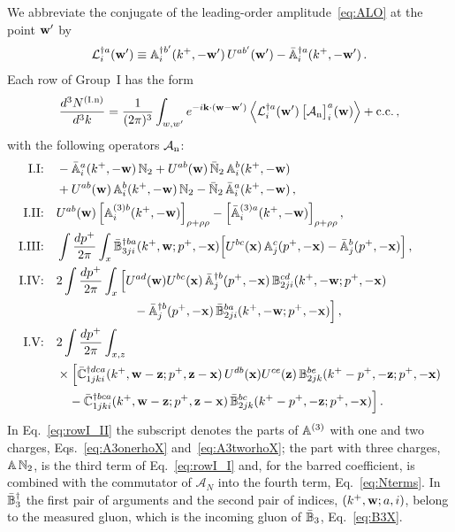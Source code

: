 We abbreviate the conjugate of the leading-order amplitude~\eqref{eq:ALO} at the point $\mathbf{w}'$ by
\begin{align}\label{eq:Ldag}
\mathcal L^{\dagger a}_i(\mathbf{w}')\equiv\mathbb{A}^{\dagger b'}_i(k^+,-\mathbf{w}')\,U^{ab'}(\mathbf{w}')-\bar{\mathbb{A}}^{\dagger a}_i(k^+,-\mathbf{w}')\,.
\end{align}
Each row of Group~I has the form
\begin{align}\label{eq:GroupIform}
\frac{d^3N^{\rm(I.n)}}{d^3k}=\frac{1}{(2\pi)^3}\int_{w,w'}e^{-i\mathbf{k}\cdot(\mathbf{w}-\mathbf{w}')}\,\Big\langle\mathcal L^{\dagger a}_i(\mathbf{w}')\,\big[\mathcal A_{\rm n}\big]^a_i(\mathbf{w})\Big\rangle+{\rm c.c.}\,,
\end{align}
with the following operators $\mathcal A_{\rm n}$:
\begin{align}
\text{I.I:}\quad&-\bar{\mathbb{A}}^a_i(k^+,-\mathbf{w})\,\mathbb{N}_2+U^{ab}(\mathbf{w})\,\bar{\mathbb{N}}_2\,\mathbb{A}^b_i(k^+,-\mathbf{w})\notag\\&+U^{ab}(\mathbf{w})\,\mathbb{A}^b_i(k^+,-\mathbf{w})\,\mathbb{N}_2-\bar{\mathbb{N}}_2\,\bar{\mathbb{A}}^a_i(k^+,-\mathbf{w})\,,\label{eq:rowI_I}\\
\text{I.II:}\quad&U^{ab}(\mathbf{w})\,\Big[\mathbb{A}^{(3)b}_i(k^+,-\mathbf{w})\Big]_{\rho+\rho\rho}-\Big[\bar{\mathbb{A}}^{(3)a}_i(k^+,-\mathbf{w})\Big]_{\rho+\rho\rho}\,,\label{eq:rowI_II}\\
\text{I.III:}\quad&\int\frac{dp^+}{2\pi}\int_x\bar{\mathbb{B}}^{\dagger ba}_{3ji}(k^+,\mathbf{w};p^+,-\mathbf{x})\Big[U^{bc}(\mathbf{x})\,\mathbb{A}^c_j(p^+,-\mathbf{x})-\bar{\mathbb{A}}^b_j(p^+,-\mathbf{x})\Big]\,,\label{eq:rowI_IIIb}\\
\text{I.IV:}\quad&2\int\frac{dp^+}{2\pi}\int_x\Big[U^{ad}(\mathbf{w})U^{bc}(\mathbf{x})\,\bar{\mathbb{A}}^{\dagger b}_j(p^+,-\mathbf{x})\,\mathbb{B}^{cd}_{2ji}(k^+,-\mathbf{w};p^+,-\mathbf{x})\notag\\
&\hspace{2.2cm}-\bar{\mathbb{A}}^{\dagger b}_j(p^+,-\mathbf{x})\,\bar{\mathbb{B}}^{ba}_{2ji}(k^+,-\mathbf{w};p^+,-\mathbf{x})\Big]\,,\label{eq:rowI_IV}\\
\text{I.V:}\quad&2\int\frac{dp^+}{2\pi}\int_{x,z}\notag\\&\times\Big[\bar{\mathbb{C}}^{\dagger dca}_{1jki}(k^+,\mathbf{w}-\mathbf{z};p^+,\mathbf{z}-\mathbf{x})\,U^{db}(\mathbf{x})U^{ce}(\mathbf{z})\,\mathbb{B}^{be}_{2jk}(k^+-p^+,-\mathbf{z};p^+,-\mathbf{x})\notag\\
&\quad-\bar{\mathbb{C}}^{\dagger bca}_{1jki}(k^+,\mathbf{w}-\mathbf{z};p^+,\mathbf{z}-\mathbf{x})\,\bar{\mathbb{B}}^{bc}_{2jk}(k^+-p^+,-\mathbf{z};p^+,-\mathbf{x})\Big]\,.\label{eq:rowI_V}
\end{align}
In Eq.~\eqref{eq:rowI_II} the subscript denotes the parts of $\mathbb{A}^{(3)}$ with one and two charges, Eqs.~\eqref{eq:A3onerhoX} and~\eqref{eq:A3tworhoX}; the part with three charges, $\mathbb{A}\,\mathbb{N}_2$, is the third term of Eq.~\eqref{eq:rowI_I} and, for the barred coefficient, is combined with the commutator of $\mathcal A_N$ into the fourth term, Eq.~\eqref{eq:Nterms}. In $\bar{\mathbb{B}}_3^\dagger$ the first pair of arguments and the second pair of indices, $(k^+,\mathbf{w};a,i)$, belong to the measured gluon, which is the incoming gluon of $\bar{\mathbb{B}}_3$, Eq.~\eqref{eq:B3X}.

